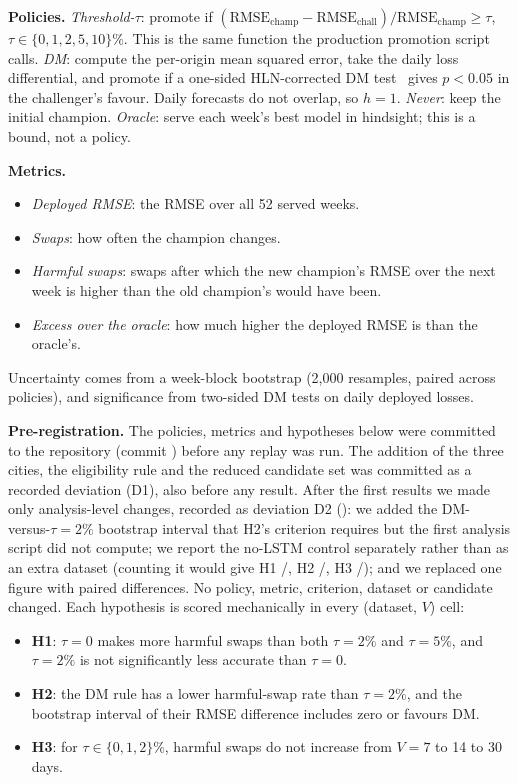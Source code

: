 \documentclass[conference]{IEEEtran}
\begin{document}
\textbf{Policies.} \emph{Threshold-\(\tau\)}: promote if
\((\mathrm{RMSE}_\text{champ}-\mathrm{RMSE}_\text{chall})/\mathrm{RMSE}_\text{champ}\ge\tau\),
\(\tau\in\{0,1,2,5,10\}\%\). This is the same function the production promotion script calls.
\emph{DM}: compute the per-origin mean squared error, take the daily loss differential, and promote
if a one-sided HLN-corrected DM test~\cite{harvey1997} gives \(p<0.05\) in the challenger's favour.
Daily forecasts do not overlap, so \(h=1\). \emph{Never}: keep the initial champion.
\emph{Oracle}: serve each week's best model in hindsight; this is a bound, not a policy.

\textbf{Metrics.}
\begin{itemize}
  \item \emph{Deployed RMSE}: the RMSE over all 52 served weeks.
  \item \emph{Swaps}: how often the champion changes.
  \item \emph{Harmful swaps}: swaps after which the new champion's RMSE over the next week is higher
        than the old champion's would have been.
  \item \emph{Excess over the oracle}: how much higher the deployed RMSE is than the oracle's.
\end{itemize}
Uncertainty comes from a week-block bootstrap (2,000 resamples, paired across policies), and
significance from two-sided DM tests on daily deployed losses.

\textbf{Pre-registration.} The policies, metrics and hypotheses below were committed to the
repository (commit \texttt{}) before any replay was run. The addition of the
three cities, the eligibility rule and the reduced candidate set was committed as a recorded
deviation (D1), also before any result. After the first results we made only analysis-level
changes, recorded as deviation D2 (\texttt{}): we added the DM-versus-\(\tau=2\%\)
bootstrap interval that H2's criterion requires but the first analysis script did not compute;
we report the no-LSTM control separately rather than as an extra dataset (counting it would give
H1 /, H2 /, H3
/); and we replaced one figure with paired differences. No policy,
metric, criterion, dataset or candidate changed. Each hypothesis is scored mechanically in every
(dataset, \(V\)) cell:
\begin{itemize}
  \item \textbf{H1}: \(\tau=0\) makes more harmful swaps than both \(\tau=2\%\) and \(\tau=5\%\),
        and \(\tau=2\%\) is not significantly less accurate than \(\tau=0\).
  \item \textbf{H2}: the DM rule has a lower harmful-swap rate than \(\tau=2\%\), and the bootstrap
        interval of their RMSE difference includes zero or favours DM.
  \item \textbf{H3}: for \(\tau\in\{0,1,2\}\%\), harmful swaps do not increase from \(V=7\) to 14 to 30 days.
\end{itemize}
\end{document}
